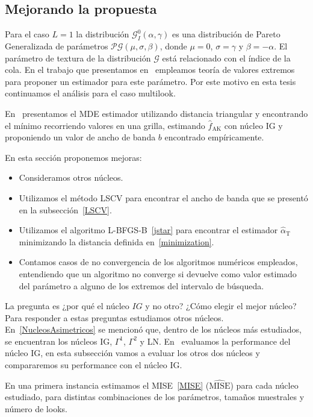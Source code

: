 \subsection{Mejorando la propuesta}
\label{mejorando}

Para el caso $L=1$ la distribución $\mathcal{G}_I^0(\alpha,\gamma)$ es una distribución de Pareto Generalizada de parámetros $\mathcal{PG}(\mu,\sigma,\beta)$, donde $\mu=0$, $\sigma=\gamma$ y $\beta=-\alpha$. El parámetro de textura de la distribución $\mathcal{G}$ está relacionado con el índice de la cola. En el trabajo que presentamos en~\cite{Chan2016} empleamos teoría de valores extremos para proponer un estimador para este parámetro. Por este motivo en esta tesis continuamos el análisis para el caso multilook.

En~\cite{gambini2015} presentamos el MDE estimador utilizando distancia triangular y encontrando el mínimo recorriendo valores en una grilla, estimando $\widehat{f}_{\text{AK}}$ con núcleo IG y proponiendo un valor de ancho de banda $b$ encontrado empíricamente.

En esta sección proponemos mejoras:

\begin{itemize}
	\item Consideramos otros núcleos.%
	\item Utilizamos el método LSCV para encontrar el ancho de banda que se presentó en la subsección~\ref{LSCV}.
	\item Utilizamos el algoritmo L-BFGS-B~\ref{jstar} para encontrar el estimador $\widehat{\alpha}_{\text{T}}$ minimizando la distancia definida en~\ref{minimization}.
	\item Contamos casos de no convergencia de los algoritmos numéricos empleados, entendiendo que un algoritmo no converge si devuelve como valor estimado del parámetro a alguno de los extremos del intervalo de búsqueda.
\end{itemize}  

La pregunta es ¿por qué el núcleo $IG$ y no otro? ¿Cómo elegir el mejor núcleo? Para responder a estas preguntas estudiamos otros núcleos. En~\ref{NucleosAsimetricos} se mencionó que, dentro de los núcleos más estudiados, se encuentran los núcleos IG, $\Gamma^1$, $\Gamma^2$ y LN. En~\cite{gambini2015} evaluamos la performance del núcleo IG, en esta subsección vamos a evaluar los otros dos núcleos y compararemos su performance con el núcleo IG. 

En una primera instancia estimamos el MISE~\eqref{MISE} ($\widehat{\text{MISE}}$) para cada núcleo estudiado, para distintas combinaciones de los parámetros, tamaños muestrales y número de looks. 

